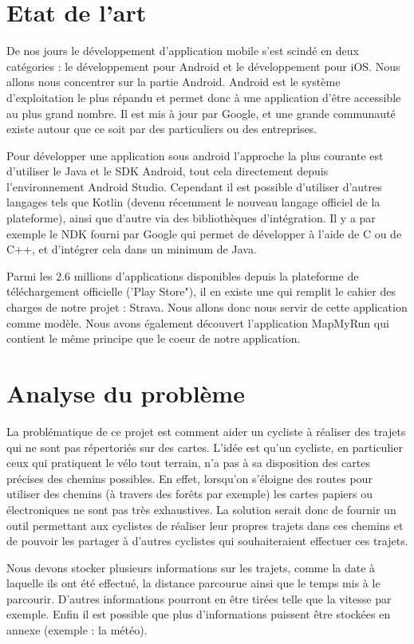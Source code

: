 \section{Etat de l'art}
De nos jours le développement d'application mobile s'est scindé en deux catégories : le développement pour Android et le développement pour iOS.
Nous allons nous concentrer sur la partie Android. Android est le système d'exploitation le plus répandu et permet donc à une application d'être
accessible au plus grand nombre. Il est mis à jour par Google, et une grande communauté existe autour que ce soit par des particuliers ou des
entreprises.

Pour développer une application sous android l'approche la plus courante est d'utiliser le Java et le SDK Android, tout cela directement depuis
l'environnement Android Studio. Cependant il est possible d'utiliser d'autres langages tels que Kotlin (devenu récemment le nouveau langage officiel
de la plateforme), ainsi que d'autre via des bibliothèques d'intégration. Il y a par exemple le NDK fourni par Google qui permet de développer à
l'aide de C ou de C++, et d'intégrer cela dans un minimum de Java.

Parmi les 2.6 millions d'applications disponibles depuis la plateforme de téléchargement officielle ('Play Store"), il en existe une qui remplit
le cahier des charges de notre projet : Strava. Nous allons donc nous servir de cette application comme modèle. Nous avons également découvert
l'application MapMyRun qui contient le même principe que le coeur de notre application.

\section{Analyse du problème}
La problématique de ce projet est comment aider un cycliste à réaliser des trajets qui ne sont pas répertoriés sur des cartes. L'idée est qu'un cycliste, 
en particulier ceux qui pratiquent le vélo tout terrain, n'a pas à sa disposition des cartes précises des chemins possibles. En effet,
lorsqu'on s'éloigne des routes pour utiliser des chemins (à travers des forêts par exemple) les cartes papiers ou électroniques ne sont pas
très exhaustives. La solution serait donc de fournir un outil permettant aux cyclistes de réaliser leur propres trajets dans ces
chemins et de pouvoir les partager à d'autres cyclistes qui souhaiteraient effectuer ces trajets.
\par
Nous devons stocker plusieurs informations sur les trajets, comme la date à laquelle ils ont été effectué, la distance parcourue ainsi que le temps mis à le parcourir. D'autres informations pourront en être tirées telle que la vitesse par exemple.
Enfin il est possible que plus d'informations puissent être stockées en annexe (exemple : la météo).
